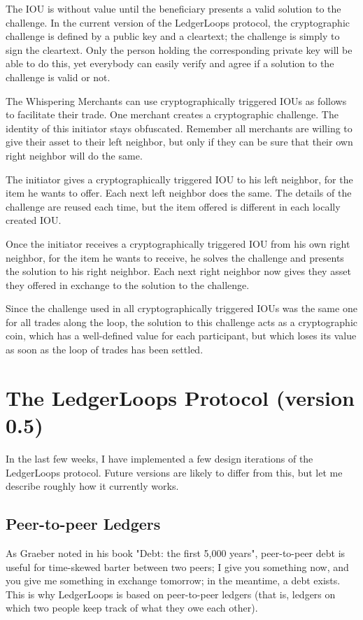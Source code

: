 \documentclass[11pt,twoside,a4paper]{article}
\begin{document}
The IOU is without value until the beneficiary presents a valid solution to the challenge. In the current version of the LedgerLoops protocol, the cryptographic challenge is defined by a public key and a cleartext; the challenge is simply to sign the cleartext. Only the person holding the corresponding private key will be able to do this, yet everybody can easily verify and agree if a solution to the challenge is valid or not.

The Whispering Merchants can use cryptographically triggered IOUs as follows to facilitate their trade. One merchant creates a cryptographic challenge. The identity of this initiator stays obfuscated. Remember all merchants are willing to give their asset to their left neighbor, but only if they can be sure that their own right neighbor will do the same.

The initiator gives a cryptographically triggered IOU to his left neighbor, for the item he wants to offer. Each next left neighbor does the same. The details of the challenge are reused each time, but the item offered is different in each locally created IOU.

Once the initiator receives a cryptographically triggered IOU from his own right neighbor, for the item he wants to receive, he solves the challenge and presents the solution to his right neighbor. Each next right neighbor now gives they asset they offered in exchange to the solution to the challenge.

Since the challenge used in all cryptographically triggered IOUs was the same one for all trades along the loop, the solution to this challenge acts as a cryptographic coin, which has a well-defined value for each participant, but which loses its value as soon as the loop of trades has been settled.

\section{The LedgerLoops Protocol (version 0.5)}
In the last few weeks, I have implemented a few design iterations of the LedgerLoops protocol. Future versions are likely to differ from this, but let me describe roughly how it currently works.

\subsection{Peer-to-peer Ledgers}
As Graeber noted in his book "Debt: the first 5,000 years", peer-to-peer debt is useful for time-skewed barter between two peers; I give you something now, and you give me something in exchange tomorrow; in the meantime, a debt exists. This is why LedgerLoops is based on peer-to-peer ledgers (that is, ledgers on which two people keep track of what they owe each other).
\end{document}
